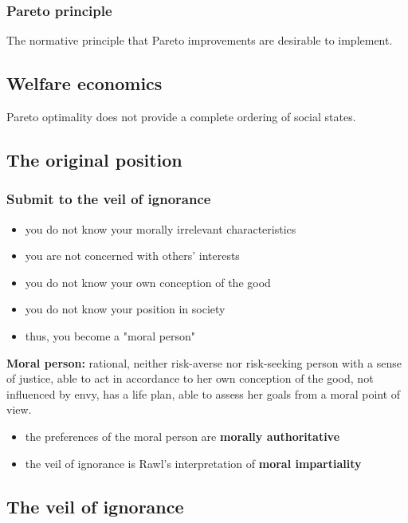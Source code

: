 \subsubsection{Pareto principle} The normative principle that Pareto
improvements are desirable to implement.

\subsection{Welfare economics}

Pareto optimality does not provide a complete ordering of social states.

\subsection{The original position}

\subsubsection{Submit to the veil of ignorance}
\begin{itemize}
	\item you do not know your morally irrelevant characteristics
	\item you are not concerned with others' interests
	\item you do not know your own conception of the good
	\item you do not know your position in society
	\item thus, you become a "moral person"
\end{itemize}

\textbf{Moral person:} rational, neither risk-averse nor risk-seeking person
with a sense of justice, able to act in accordance to her own conception of the
good, not influenced by envy, has a life plan, able to assess her goals from a
moral point of view.
\begin{itemize}
	\item the preferences of the moral person are \textbf{morally
	authoritative}
	\item the veil of ignorance is Rawl's interpretation of \textbf{moral
	impartiality}
\end{itemize}

\subsection{The veil of ignorance}

